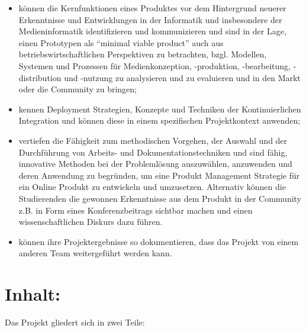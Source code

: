 \begin{itemize}
\tightlist
\item
  können die Kernfunktionen eines Produktes vor dem Hintergrund neuerer
  Erkenntnisse und Entwicklungen in der Informatik und insbesondere der
  Medieninformatik identifizieren und kommunizieren und sind in der
  Lage, einen Prototypen als ``minimal viable product'' auch aus
  betriebswirtschaftlichen Perspektiven zu betrachten, bzgl. Modellen,
  Systemen und Prozessen für Medienkonzeption, -produktion,
  -bearbeitung, -distribution und -nutzung zu analysieren und zu
  evaluieren und in den Markt oder die Community zu bringen;
\item
  kennen Deployment Strategien, Konzepte und Techniken der
  Kontinuierlichen Integration und können diese in einem spezifischen
  Projektkontext anwenden;
\item
  vertiefen die Fähigkeit zum methodischen Vorgehen, der Auswahl und der
  Durchführung von Arbeits- und Dokumentationstechniken und sind fähig,
  innovative Methoden bei der Problemlösung auszuwählen, anzuwenden und
  deren Anwendung zu begründen, um eine Produkt Management Strategie für
  ein Online Produkt zu entwickeln und umzusetzen. Alternativ können die
  Studierenden die gewonnen Erkenntnisse aus dem Produkt in der
  Community z.B. in Form eines Konferenzbeitrags sichtbar machen und
  einen wissenschaftlichen Diskurs dazu führen.
\item
  können ihre Projektergebnisse so dokumentieren, dass das Projekt von
  einem anderen Team weitergeführt werden kann.
\end{itemize}

\section*{Inhalt:\label{/mi-2017/modulbeschreibungen-master/MA_Modul_Projekt_Verwertung}}\label{inhaltpathlabelmi-2017modulbeschreibungen-mastermaux5fmodulux5fprojektux5fverwertung}

Das Projekt gliedert sich in zwei Teile:

